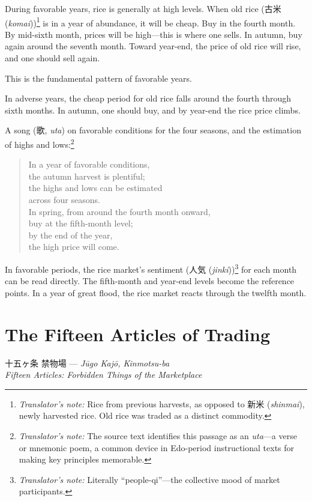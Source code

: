 \documentclass[10pt, openany]{book}
\newcommand{\jp}[1]{{\japanesefont #1}}
\newcommand{\tn}[1]{\footnote{\textit{Translator's note:} #1}}
\newcommand{\jt}[2]{\jp{#1} (\textit{#2})}
\begin{document}
During favorable years, rice is generally at high levels. When old rice
(\jt{古米}{komai})\tn{Rice from previous harvests, as opposed to
\jp{新米} (\textit{shinmai}), newly harvested rice. Old rice was traded as
a distinct commodity.} is in a year of abundance, it will be cheap. Buy in
the fourth month. By mid-sixth month, prices will be high---this is where
one sells. In autumn, buy again around the seventh month. Toward year-end,
the price of old rice will rise, and one should sell again.

This is the fundamental pattern of favorable years.

In adverse years, the cheap period for old rice falls around the fourth
through sixth months. In autumn, one should buy, and by year-end the rice
price climbs.

A song (\jp{歌}, \textit{uta}) on favorable conditions for the four
seasons, and the estimation of highs and lows:\tn{The source text
identifies this passage as an \textit{uta}---a verse or mnemonic poem,
a common device in Edo-period instructional texts for making key
principles memorable.}

\begin{verse}
In a year of favorable conditions,\\
the autumn harvest is plentiful;\\
the highs and lows can be estimated\\
across four seasons.\\[0.5em]
In spring, from around the fourth month onward,\\
buy at the fifth-month level;\\
by the end of the year,\\
the high price will come.
\end{verse}

In favorable periods, the rice market's sentiment (\jt{人気}{jinki})\tn{%
Literally ``people-qi''---the collective mood of market participants.} for
each month can be read directly. The fifth-month and year-end levels become
the reference points. In a year of great flood, the rice market reacts
through the twelfth month.

\section{The Fifteen Articles of Trading}

\begin{center}
\jp{十五ヶ条 禁物場} --- \textit{J\=ugo Kaj\=o, Kinmotsu-ba}\\
\textit{Fifteen Articles: Forbidden Things of the Marketplace}
\end{center}
\end{document}
